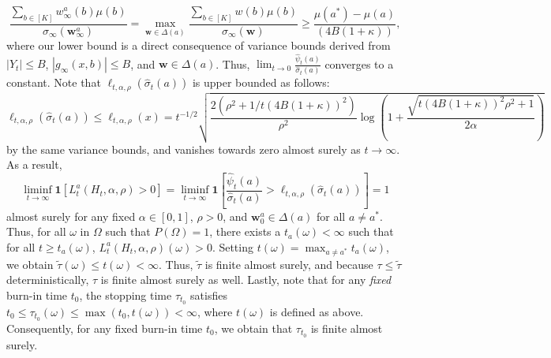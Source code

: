 \documentclass{article}
\begin{document}
\begin{appendices}
\begin{equation}
    \frac{\sum_{b \in [K]}w_\infty^a(b)\mu(b)}{\sigma_\infty(\bm{w}_\infty^a)} = \max_{\bm{w} \in \Delta(a)} \frac{\sum_{b \in [K]}w(b) \mu(b)}{\sigma_\infty(\bm{w})} \geq \frac{\mu(a^*) - \mu(a)}{(4B(1+\kappa))},
\end{equation}
where our lower bound is a direct consequence of variance bounds derived from $|Y_t| \leq B$, $|g_\infty(x,b)| \leq B$, and $\bm{w} \in \Delta(a)$. Thus, $\lim_{t \rightarrow 0}\frac{\hat\psi_t(a)}{\hat\sigma_t(a)}$ converges to a constant. Note that $\ell_{t,\alpha,\rho}(\hat\sigma_t(a))$ is upper bounded as follows: 
\begin{equation}
    \ell_{t,\alpha,\rho}(\hat\sigma_t(a)) \leq \ell_{t,\alpha,\rho}(x) = t^{-1/2}\sqrt{\frac{2(\rho^2+1/t(4B(1+\kappa))^2)}{\rho^2}\log\left(1+\frac{\sqrt{t (4B(1+\kappa))^2\rho^2 + 1}}{2\alpha}\right)}
\end{equation}
by the same variance bounds, and vanishes towards zero almost surely as $t \rightarrow \infty$. As a result, 
\begin{equation}
    \liminf_{t \rightarrow \infty}\mathbf{1}[L_t^a(H_t, \alpha,\rho ) > 0] = \liminf_{t \rightarrow \infty}\mathbf{1}\left[\frac{\hat\psi_t(a)}{\hat\sigma_t(a)} > \ell_{t,\alpha, \rho}(\hat\sigma_t(a))\right]  = 1
\end{equation}
almost surely for any fixed $\alpha \in [0,1]$, $\rho > 0$, and $\bm{w}_0^a \in \Delta(a)$ for all $a \neq a^*$. Thus, for all $\omega$ in $\Omega$ such that $P(\Omega) = 1$, there exists a $t_a(\omega) < \infty$ such that for all $t \geq t_a(\omega)$, $L_t^a(H_t, \alpha, \rho)(\omega) > 0$. Setting $t(\omega) = \max_{a \neq a^*} t_a(\omega)$, we obtain $\tilde{\tau}(\omega) \leq t(\omega) < \infty$. Thus, $\tilde{\tau}$ is finite almost surely, and because $\tau \leq \tilde{\tau}$ deterministically, $\tau$ is finite almost surely as well. Lastly, note that for any \textit{fixed} burn-in time $t_0$, the stopping time $\tau_{t_0}$ satisfies $t_0 \leq \tau_{t_0}(\omega) \leq \max(t_0, t(\omega)) < \infty$, where $t(\omega)$ is defined as above. Consequently, for any fixed burn-in time $t_0$, we obtain that $\tau_{t_0}$ is finite almost surely.





\end{appendices}
\end{document}
